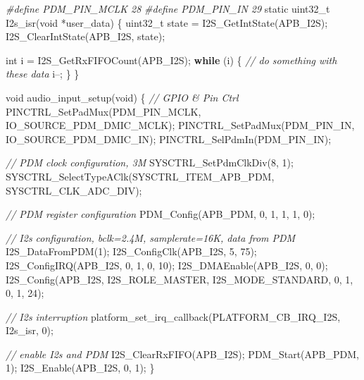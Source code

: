\documentclass[
  12pt,
]{book}
\newenvironment{Shaded}{\begin{snugshade}}{\end{snugshade}}
\newcommand{\CommentTok}[1]{\textcolor[rgb]{0.56,0.35,0.01}{\textit{#1}}}
\newcommand{\ControlFlowTok}[1]{\textcolor[rgb]{0.13,0.29,0.53}{\textbf{#1}}}
\newcommand{\DataTypeTok}[1]{\textcolor[rgb]{0.13,0.29,0.53}{#1}}
\newcommand{\DecValTok}[1]{\textcolor[rgb]{0.00,0.00,0.81}{#1}}
\newcommand{\NormalTok}[1]{#1}
\newcommand{\PreprocessorTok}[1]{\textcolor[rgb]{0.56,0.35,0.01}{\textit{#1}}}
\begin{document}
\begin{Shaded}
\begin{Highlighting}[]
\PreprocessorTok{#define PDM_PIN_MCLK        28}
\PreprocessorTok{#define PDM_PIN_IN          29}
\DataTypeTok{static} \DataTypeTok{uint32_t}\NormalTok{ I2s_isr(}\DataTypeTok{void}\NormalTok{ *user_data)}
\NormalTok{\{ }
    \DataTypeTok{uint32_t}\NormalTok{ state = I2S_GetIntState(APB_I2S);}
\NormalTok{    I2S_ClearIntState(APB_I2S, state);}

    \DataTypeTok{int}\NormalTok{ i = I2S_GetRxFIFOCount(APB_I2S);}
    \ControlFlowTok{while}\NormalTok{ (i) \{}
        \CommentTok{// do something with these data}
\NormalTok{        i--;}
\NormalTok{    \}}
\NormalTok{\}}

\DataTypeTok{void}\NormalTok{ audio_input_setup(}\DataTypeTok{void}\NormalTok{)}
\NormalTok{\{}
    \CommentTok{// GPIO & Pin Ctrl}
\NormalTok{    PINCTRL_SetPadMux(PDM_PIN_MCLK, IO_SOURCE_PDM_DMIC_MCLK);}
\NormalTok{    PINCTRL_SetPadMux(PDM_PIN_IN, IO_SOURCE_PDM_DMIC_IN);}
\NormalTok{    PINCTRL_SelPdmIn(PDM_PIN_IN);}

    \CommentTok{// PDM clock configuration, 3M}
\NormalTok{    SYSCTRL_SetPdmClkDiv(}\DecValTok{8}\NormalTok{, }\DecValTok{1}\NormalTok{);}
\NormalTok{    SYSCTRL_SelectTypeAClk(SYSCTRL_ITEM_APB_PDM, SYSCTRL_CLK_ADC_DIV);}
    
    \CommentTok{// PDM register configuration}
\NormalTok{    PDM_Config(APB_PDM, }\DecValTok{0}\NormalTok{, }\DecValTok{1}\NormalTok{, }\DecValTok{1}\NormalTok{, }\DecValTok{1}\NormalTok{, }\DecValTok{0}\NormalTok{);    }

    \CommentTok{// I2s configuration, bclk=2.4M, samplerate=16K, data from PDM}
\NormalTok{    I2S_DataFromPDM(}\DecValTok{1}\NormalTok{);    }
\NormalTok{    I2S_ConfigClk(APB_I2S, }\DecValTok{5}\NormalTok{, }\DecValTok{75}\NormalTok{);}
\NormalTok{    I2S_ConfigIRQ(APB_I2S, }\DecValTok{0}\NormalTok{, }\DecValTok{1}\NormalTok{, }\DecValTok{0}\NormalTok{, }\DecValTok{10}\NormalTok{);}
\NormalTok{    I2S_DMAEnable(APB_I2S, }\DecValTok{0}\NormalTok{, }\DecValTok{0}\NormalTok{);    }
\NormalTok{    I2S_Config(APB_I2S, I2S_ROLE_MASTER, I2S_MODE_STANDARD, }\DecValTok{0}\NormalTok{, }\DecValTok{1}\NormalTok{, }\DecValTok{0}\NormalTok{, }\DecValTok{1}\NormalTok{, }\DecValTok{24}\NormalTok{);}
    
    \CommentTok{// I2s interruption}
\NormalTok{    platform_set_irq_callback(PLATFORM_CB_IRQ_I2S, I2s_isr, }\DecValTok{0}\NormalTok{);}

    \CommentTok{// enable I2s and PDM}
\NormalTok{    I2S_ClearRxFIFO(APB_I2S);}
\NormalTok{    PDM_Start(APB_PDM, }\DecValTok{1}\NormalTok{);}
\NormalTok{    I2S_Enable(APB_I2S, }\DecValTok{0}\NormalTok{, }\DecValTok{1}\NormalTok{);}
\NormalTok{\}}
\end{Highlighting}
\end{Shaded}
\end{document}
